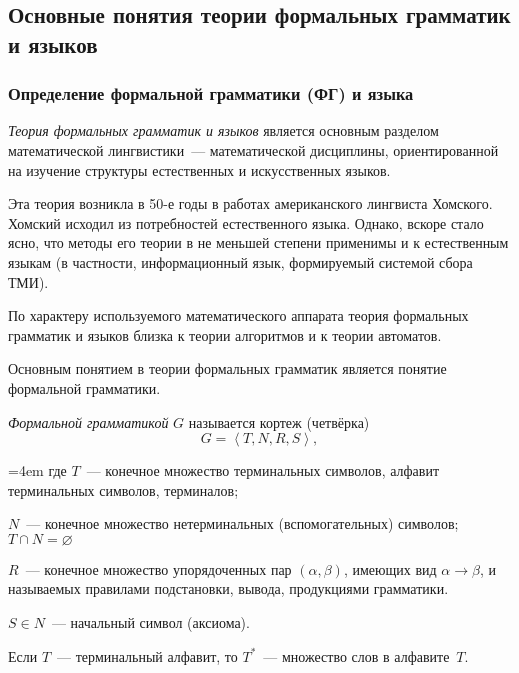 \subsection{Основные понятия теории формальных грамматик и языков}

\subsubsection{Определение формальной грамматики (ФГ) и языка}


\emph{Теория формальных грамматик и языков} является основным разделом
математической лингвистики~--- математической дисциплины,
ориентированной на изучение структуры естественных и искусственных
языков.

Эта теория возникла в 50-е годы в работах американского лингвиста
Хомского. Хомский исходил из потребностей естественного языка. Однако,
вскоре стало ясно, что методы его теории в не меньшей степени
применимы и к естественным языкам (в частности, информационный язык,
формируемый системой сбора ТМИ).

По характеру используемого математического аппарата теория формальных
грамматик и языков близка к теории алгоритмов и к теории автоматов.

Основным понятием в теории формальных грамматик является понятие
формальной грамматики.

\begin{defin}
  \emph{Формальной грамматикой} $G$ называется кортеж (четвёрка)
  \begin{equation}
    \label{eq:G}
    G = \left<T, N, R, S\right>,
  \end{equation}
  
  {\hangindent=4em
    {\noindent где $T$~--- конечное множество терминальных символов, алфавит
      терминальных символов, терминалов;}
    
    $N$~--- конечное множество нетерминальных (вспомогательных)
    символов; $T \cap N = \varnothing$
    
    $R$~--- конечное множество упорядоченных пар $(\alpha, \beta)$,
    имеющих вид $\alpha \to \beta$, и называемых правилами подстановки,
    вывода, продукциями грамматики.
    
    $S \in N$~--- начальный символ (аксиома).
  }
\end{defin}

\begin{rem}
  Если $T$~--- терминальный алфавит, то $T^{*}$~--- множество слов
  в алфавите~$T$.
\end{rem}

